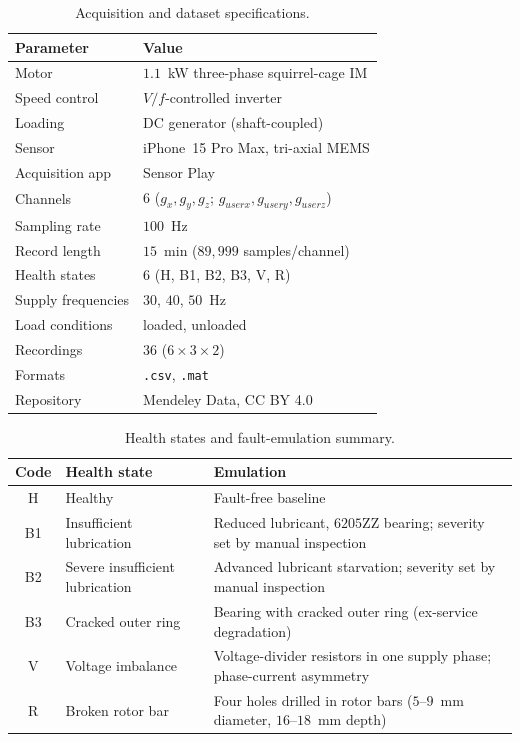 \begin{table}[t]
\centering
\caption{Acquisition and dataset specifications.}
\label{tab:specs}
\renewcommand{\arraystretch}{1.2}
\begin{tabular}{@{}ll@{}}
\toprule
\textbf{Parameter} & \textbf{Value} \\
\midrule
Motor & $1.1$~kW three-phase squirrel-cage IM \\
Speed control & $V/f$-controlled inverter \\
Loading & DC generator (shaft-coupled) \\
Sensor & iPhone~15 Pro Max, tri-axial MEMS \\
Acquisition app & Sensor Play \\
Channels & $6$ ($g_x,g_y,g_z$; $g_{userx},g_{usery},g_{userz}$) \\
Sampling rate & $100$~Hz \\
Record length & $15$~min ($89{,}999$ samples/channel) \\
Health states & $6$ (H, B1, B2, B3, V, R) \\
Supply frequencies & $30$, $40$, $50$~Hz \\
Load conditions & loaded, unloaded \\
Recordings & $36$ ($6\times3\times2$) \\
Formats & \texttt{.csv}, \texttt{.mat} \\
Repository & Mendeley Data, CC BY 4.0 \\
\bottomrule
\end{tabular}
\end{table}

\begin{table}[t]
\centering
\caption{Health states and fault-emulation summary.}
\label{tab:faults}
\renewcommand{\arraystretch}{1.25}
\begin{tabular}{@{}clp{4.2cm}@{}}
\toprule
\textbf{Code} & \textbf{Health state} & \textbf{Emulation} \\
\midrule
H  & Healthy & Fault-free baseline \\
B1 & Insufficient lubrication & Reduced lubricant, $6205$ZZ bearing; severity set by manual inspection \\
B2 & Severe insufficient lubrication & Advanced lubricant starvation; severity set by manual inspection \\
B3 & Cracked outer ring & Bearing with cracked outer ring (ex-service degradation) \\
V  & Voltage imbalance & Voltage-divider resistors in one supply phase; phase-current asymmetry \\
R  & Broken rotor bar & Four holes drilled in rotor bars ($5$--$9$~mm diameter, $16$--$18$~mm depth) \\
\bottomrule
\end{tabular}
\end{table}

